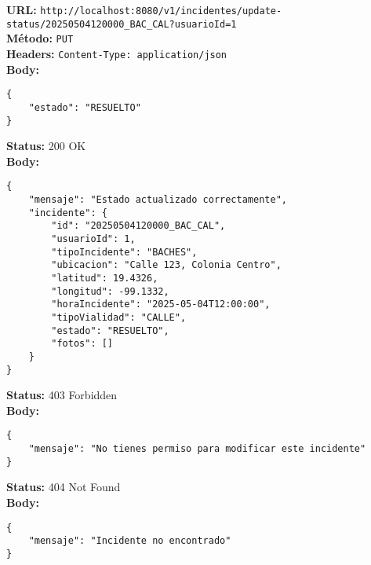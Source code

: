 \begin{tcolorbox}[request]
    \textbf{URL:} \textcolor{urlColor}{\texttt{http://localhost:8080/v1/incidentes/update-status/20250504120000\_BAC\_CAL?usuarioId=1}}\\
    \textbf{Método:} \textcolor{methodColor}{\texttt{PUT}}\\
    \textbf{Headers:} \textcolor{headerColor}{\texttt{Content-Type: application/json}}\\
    \textbf{Body:}
    \begin{verbatim}
{
    "estado": "RESUELTO"
}
    \end{verbatim}
\end{tcolorbox}

\begin{tcolorbox}[response]
    \textbf{Status:} 200 OK\\
    \textbf{Body:}
    \begin{verbatim}
{
    "mensaje": "Estado actualizado correctamente",
    "incidente": {
        "id": "20250504120000_BAC_CAL",
        "usuarioId": 1,
        "tipoIncidente": "BACHES",
        "ubicacion": "Calle 123, Colonia Centro",
        "latitud": 19.4326,
        "longitud": -99.1332,
        "horaIncidente": "2025-05-04T12:00:00",
        "tipoVialidad": "CALLE",
        "estado": "RESUELTO",
        "fotos": []
    }
}
    \end{verbatim}
\end{tcolorbox}

\begin{tcolorbox}[response]
    \textbf{Status:} 403 Forbidden\\
    \textbf{Body:}
    \begin{verbatim}
{
    "mensaje": "No tienes permiso para modificar este incidente"
}
    \end{verbatim}
\end{tcolorbox}

\begin{tcolorbox}[response]
    \textbf{Status:} 404 Not Found\\
    \textbf{Body:}
    \begin{verbatim}
{
    "mensaje": "Incidente no encontrado"
}
    \end{verbatim}
\end{tcolorbox}

